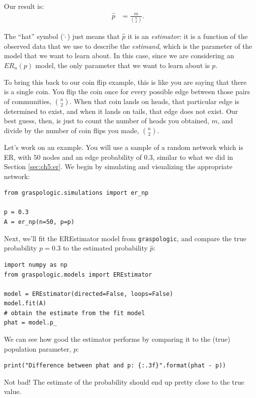 Our result is:
\begin{align*}
    \hat p &= \frac{m}{\binom n 2}.
\end{align*}

The ``hat'' symbol ($\hat \cdot $) just means that $\hat p$ it is an \textit{estimator}: it is a function of the observed data that we use to describe the \textit{estimand}, which is the parameter of the model that we want to learn about. In this case, since we are considering an $ER_n(p)$ model, the only parameter that we want to learn about is $p$.

To bring this back to our coin flip example, this is like you are saying that there is a single coin. You flip the coin once for every possible edge between those pairs of communities, $\binom n 2$. When that coin lands on heads, that particular edge is determined to exist, and when it lands on tails, that edge does not exist. Our best guess, then, is just to count the number of heads you obtained, $m$, and divide by the number of coin flips you made, $\binom n 2$. 

Let's work on an example. You will use a sample of a random network which is ER, with $50$ nodes and an edge probability of $0.3$, similar to what we did in Section \ref{sec:ch5:er}. We begin by simulating and visualizing the appropriate network: 


\begin{lstlisting}[style=python]
from graspologic.simulations import er_np

p = 0.3
A = er_np(n=50, p=p)
\end{lstlisting}

Next, we'll fit the EREstimator model from \texttt{graspologic}, and compare the true probability $p=0.3$ to the estimated probability $\hat p$:
\begin{lstlisting}[style=python]
import numpy as np
from graspologic.models import EREstimator

model = EREstimator(directed=False, loops=False)
model.fit(A)
# obtain the estimate from the fit model
phat = model.p_
\end{lstlisting}

We can see how good the estimator performs by comparing it to the (true) population parameter, $p$:

\begin{lstlisting}[style=python]
print("Difference between phat and p: {:.3f}".format(phat - p))
\end{lstlisting}

Not bad! The estimate of the probability should end up pretty close to the true value. 

